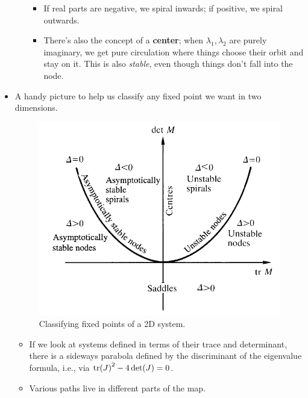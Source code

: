 \documentclass[../notes.tex]{subfiles}
\begin{document}
\begin{itemize}
\begin{enumerate}
        \begin{itemize}
            \item If real parts are negative, we spiral inwards; if positive, we spiral outwards.
            \item There's also the concept of a \textbf{center}; when $\lambda_1,\lambda_2$ are purely imaginary, we get pure circulation where things choose their orbit and stay on it. This is also \emph{stable}, even though things don't fall into the node.
        \end{itemize}
    \end{enumerate}
    \item A handy picture to help us classify any fixed point we want in two dimensions.
    \begin{figure}[h!]
        \centering
        \includegraphics[width=0.4\linewidth]{../ExtFiles/fixedPoints2D.png}
        \caption{Classifying fixed points of a 2D system.}
        \label{fig:fixedPoints2D}
    \end{figure}
    \begin{itemize}
        \item If we look at systems defined in terms of their trace and determinant, there is a sideways parabola defined by the discriminant of the eigenvalue formula, i.e., via $\tr(J)^2-4\det(J)=0$.
        \item Various paths live in different parts of the map.
    \end{itemize}
\end{itemize}
\end{document}
